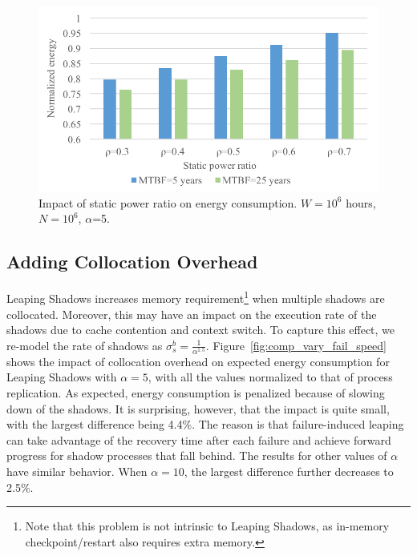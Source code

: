 \begin{figure}[!h]
	\begin{center}
		\includegraphics[width=0.7\columnwidth]{Figures/ts_power_5}
	\end{center}
	\caption{Impact of static power ratio on energy consumption. $W=10^6$ hours, $N=10^6$, $\alpha$=5.}
	\label{fig:power_ratio}
\end{figure}


\subsection{Adding Collocation Overhead}
\label{eval_collocation}

Leaping Shadows increases memory requirement\footnote{Note that this problem is not intrinsic to Leaping Shadows, as in-memory checkpoint/restart also requires extra memory.} when multiple shadows are collocated. Moreover, this may have an impact on the execution rate of the shadows due to cache contention and context switch. 
To capture this effect,  
we re-model the rate of shadows as $\sigma_s^b=\frac{1}{\alpha^{1.5}}$.
Figure~\ref{fig:comp_vary_fail_speed} shows the impact of collocation overhead on expected energy consumption for Leaping Shadows with $\alpha=5$, with all the values normalized to that of process replication. %
As expected, energy consumption is penalized because
of slowing down of the shadows. It is surprising, however, that the impact is quite small, with the largest difference being 4.4\%. The reason is that failure-induced leaping can take advantage of the recovery time after each failure and achieve forward progress for shadow processes that fall behind. 
The results for other values of $\alpha$ have similar behavior. 
When $\alpha=10$, the largest difference further decreases to 2.5\%. 

